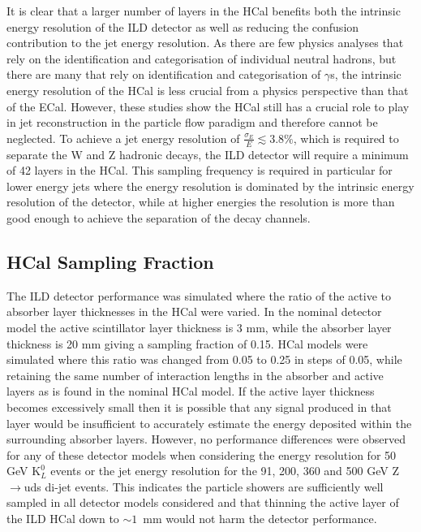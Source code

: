 It is clear that a larger number of layers in the HCal benefits both the intrinsic energy resolution of the ILD detector as well as reducing the confusion contribution to the jet energy resolution.  As there are few physics analyses that rely on the identification and categorisation of individual neutral hadrons, but there are many that rely on identification and categorisation of $\gamma$s, the intrinsic energy resolution of the HCal is less crucial from a physics perspective than that of the ECal.  However, these studies show the HCal still has a crucial role to play in jet reconstruction in the particle flow paradigm and therefore cannot be neglected.  To achieve a jet energy resolution of $\frac{\sigma_{E}}{E} \lesssim 3.8\%$, which is required to separate the W and Z hadronic decays, the ILD detector will require a minimum of 42 layers in the HCal.  This sampling frequency is required in particular for lower energy jets where the energy resolution is dominated by the intrinsic energy resolution of the detector, while at higher energies the resolution is more than good enough to achieve the separation of the decay channels.  


\subsection{HCal Sampling Fraction}
\label{sec:hcalsamplingfraction}
The ILD detector performance was simulated where the ratio of the active to absorber layer thicknesses in the HCal were varied.  In the nominal detector model the active scintillator layer thickness is 3 mm, while the absorber layer thickness is 20 mm giving a sampling fraction of 0.15.  HCal models were simulated where this ratio was changed from 0.05 to 0.25 in steps of 0.05, while retaining the same number of interaction lengths in the absorber and active layers as is found in the nominal HCal model.  If the active layer thickness becomes excessively small then it is possible that any signal produced in that layer would be insufficient to accurately estimate the energy deposited within the surrounding absorber layers.  However, no performance differences were observed for any of these detector models when considering the energy resolution for 50 GeV $\text{K}^{0}_{L}$ events or the jet energy resolution for the 91, 200, 360 and 500 GeV Z$\rightarrow$uds di-jet events.  This indicates the particle showers are sufficiently well sampled in all detector models considered and that thinning the active layer of the ILD HCal down to $\sim1$~mm would not harm the detector performance.  

